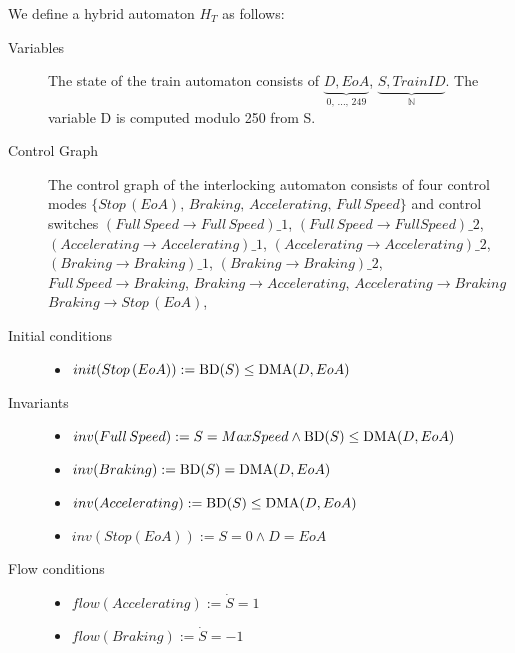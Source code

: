 \begin{mydef}

We define a hybrid automaton $H_{T}$ as follows:
\begin{description}
\item[Variables] The state of the train automaton consists of $\underbrace{D, EoA}_\text{0, \ldots , 249}$, \newline $\underbrace{S, TrainID}_{\mathbb{N}}$. The variable D is computed modulo 250 from S.

\item[Control Graph] The control graph of the interlocking automaton consists of four control modes $\{Stop \, (EoA), \, Braking, \, Accelerating, \, Full \,  Speed \}$ and control switches $(Full \, Speed \to  Full \, Speed)\_1$, $(Full \, Speed \to Full Speed)\_2$, $(Accelerating \to Accelerating)\_1$, $(Accelerating \to Accelerating)\_2$, $(Braking \to Braking)\_1$, $(Braking \to Braking)\_2$,  $Full \, Speed \to Braking$, $Braking \to Accelerating$, $Accelerating \to Braking$  $Braking \to Stop \, (EoA)$, 

\item[Initial conditions] \hspace*{0mm}
\begin{itemize} 
	\item $init(Stop \, (EoA)) :=   \mathrm{BD}(S) \leq \mathrm{DMA}(D,EoA)  $
\end{itemize}

\item[Invariants] \hspace*{0mm}
	\begin{itemize}
	\item $inv(Full \, Speed) :=   S = MaxSpeed \wedge \mathrm{BD}(S) \leq \mathrm{DMA}(D,EoA)$ 

	\item $inv(Braking)  :=  \mathrm{BD}(S) = \mathrm{DMA}(D,EoA)$
         \item $inv(Accelerating) := \mathrm{BD}(S) \leq \mathrm{DMA}(D,EoA)$

	\item $inv(Stop (EoA)) := S = 0 \wedge D = EoA$ 
	\end{itemize}
             
\item[Flow conditions] \hspace*{0mm}
	\begin{itemize}
	\item $flow(Accelerating):= \dot{S} = 1$ 
	
	\item $flow(Braking) := \dot{S} = -1$


\end{itemize}
\end{description}
\end{mydef}
